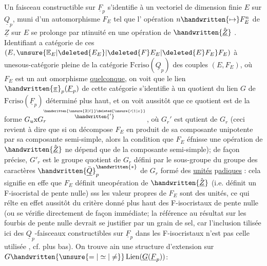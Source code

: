Un faisceau constructible sur $\underline{F}_p$ s'identifie à un vectoriel de dimension finie $E$ sur $\underline{Q}_p$, muni d'un automorphisme $F_E$ tel que l' opération $n\handwritten{\mapsto}F_E^n$ de $\underline{Z}$ sur $E$ se prolonge par  ntinuité en une opération de  $\handwritten{\hat{\underline{Z}}}$ . Identifiant  a catégorie de ces $(E,\unsure{\mathbb{E}_E|\deleted{E_E}|\deleted{F}E_E|\deleted{E}F_E}F_E)$ à une\handwritten{/}sous-catégorie pleine de la catégorie  $\mathrm{Fcriso}(\underline{Q}_p)$ des couples $(E,F_E)$, où $F_E$ est un aut omorphisme \uline{quelconque}, on voit que le lien  $\handwritten{\underline{\pi}}_p(\underline{F}_p)$ de cette catégorie s'identifie à un quotient du lien $G$ de $\mathrm{Fcriso}(\underline{F}_p)$ déterminé plus haut, et on voit aussitôt que ce quotient est de la forme $G_u\mathrm{x}G_r^{\overset{\handwritten{\unsure{2|\ell}}\deleted{\unsure{\prime|1|x}}}{\handwritten{'}}}$, où $G_r'$ est  qutient de $G_r$ (ceci revient à dire que si on décompose $F_E$ en produit de sa composante unipotente par sa composante semi-simple, alors la condition que $F_E$ éfnisse une opération de $\handwritten{\hat{\underline{Z}}}$ ne dépend que de la composante semi-simple); de façon précise, $G'_r$ est le groupe quotient de $G_r$ défini par le sous-groupe du groupe des caractères $\handwritten{\bar{\underline{Q}}}_p^{\handwritten{*}}$ de $G_r$ formé des \uline{unités} p\uline{adiques} : cela signifie en effe que $F_E$ définit uneopération de  $\handwritten{\hat{\underline{Z}}}$ (i.e. définit un F-isocristal de pente nulle) sss les valeur propres de $F_E$ sont des unités, ce qui rélte en effet aussitôt du critère donné plus haut des F-isocristaux de pente nulle (ou se vérifie directement de façon immédiate; la référence au résultat sur les fourbis de pente nulle devrait se justifier par un grain de sel, car l'inclusion tilisée ici des $\underline{Q}_p$-faisceaux constructibles sur $\underline{F}_p$ dans les F-isocristaux n'est pas celle utilisée , cf. plus bas). On trouve ain une structure d'extension sur $G\handwritten{\unsure{=|\simeq|\ne}}\operatorname{Lien}(\underline{G}(\underline{F}_p))$:
